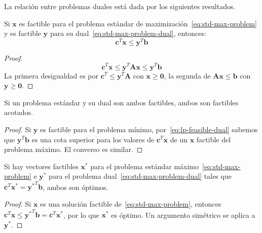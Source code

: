   La relación entre problemas duales está dada por los siguientes resultados.
  \begin{theorem}
    \label{theo:lp-feasible-dual}
    Si \(\mathbf{x}\) es factible
    para el problema estándar de maximización~\eqref{eq:std-max-problem}
    y es factible \(\mathbf{y}\) para su dual~\eqref{eq:std-max-problem-dual},
    entonces:
    \begin{equation}
      \label{eq:lp-feasible-dual}
      \mathbf{c}^T \mathbf{x}
        \le \mathbf{y}^T \mathbf{b}
    \end{equation}
  \end{theorem}
  \begin{proof}
    \begin{equation*}
      \mathbf{c}^T \mathbf{x}
        \le \mathbf{y}^T \mathbf{A} \mathbf{x}
        \le \mathbf{y}^T \mathbf{b}
    \end{equation*}
    La primera desigualdad
    es por \(\mathbf{c}^T \le \mathbf{y}^T \mathbf{A}\)
    con \(\mathbf{x} \ge \mathbf{0}\),
    la segunda de \(\mathbf{A} \mathbf{x} \le \mathbf{b}\)
    con \(\mathbf{y} \ge \mathbf{0}\).
  \end{proof}
  \begin{corollary}
    \label{cor:lp-feasible-dual-1}
    Si un problema estándar y su dual son ambos factibles,
    ambos son factibles acotados.
  \end{corollary}
  \begin{proof}
    Si \(\mathbf{y}\) es factible para el problema mínimo,
    por~\eqref{eq:lp-feasible-dual}
    sabemos que \(\mathbf{y}^T \mathbf{b}\) es una cota superior
    para los valores de \(\mathbf{c}^T \mathbf{x}\) de un \(\mathbf{x}\)
    factible del problema máximo.
    El converso es similar.
  \end{proof}
  \begin{corollary}
    \label{cor:lp-feasible-dual-2}
    Si hay vectores factibles \(\mathbf{x^*}\)
    para el problema estándar máximo~\eqref{eq:std-max-problem}
    e \(\mathbf{y^*}\)
    para el problema dual~\eqref{eq:std-max-problem-dual}
    tales que \(\mathbf{c}^T \mathbf{x^*} = \mathbf{y^*}^T \mathbf{b}\),
    ambos son óptimos.
  \end{corollary}
  \begin{proof}
    Si \(\mathbf{x}\) es una solución factible de~\eqref{eq:std-max-problem},
    entonces
    \(\mathbf{c}^T \mathbf{x}
        \le \mathbf{y^*}^T \mathbf{b}
        = \mathbf{c}^T \mathbf{x^*}\),
    por lo que \(\mathbf{x^*}\) es óptimo.
    Un argumento simétrico se aplica a \(\mathbf{y^*}\).
  \end{proof}
